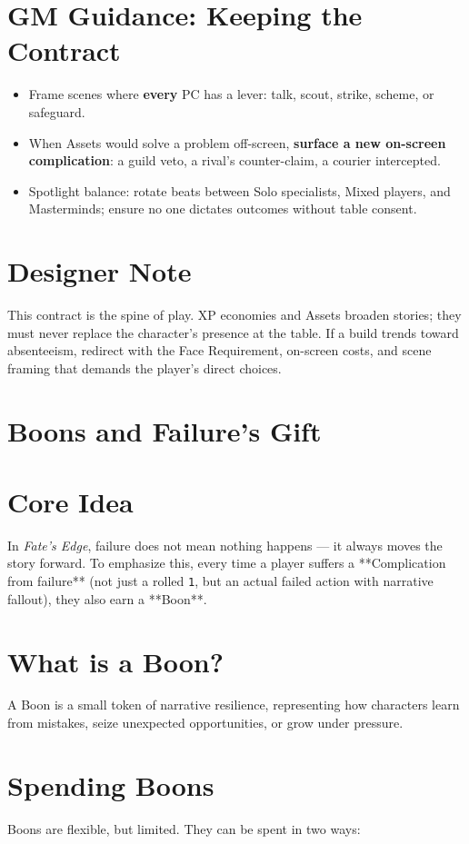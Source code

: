 \documentclass[12pt]{article}
\begin{document}
\section{GM Guidance: Keeping the Contract}
\begin{itemize}
  \item Frame scenes where \textbf{every} PC has a lever: talk, scout, strike, scheme, or safeguard.
  \item When Assets would solve a problem off-screen, \textbf{surface a new on-screen complication}: a guild veto, a rival’s counter-claim, a courier intercepted.
  \item Spotlight balance: rotate beats between Solo specialists, Mixed players, and Masterminds; ensure no one dictates outcomes without table consent.
\end{itemize}

\section{Designer Note}
This contract is the spine of play. XP economies and Assets broaden stories; they must never replace the character’s presence at the table. If a build trends toward absenteeism, redirect with the Face Requirement, on-screen costs, and scene framing that demands the player’s direct choices.

\section{Boons and Failure's Gift}

\section*{Core Idea}
In \textit{Fate’s Edge}, failure does not mean nothing happens — it always moves the story forward.  
To emphasize this, every time a player suffers a **Complication from failure** (not just a rolled \texttt{1}, but an actual failed action with narrative fallout), they also earn a **Boon**.

\section*{What is a Boon?}
A Boon is a small token of narrative resilience, representing how characters learn from mistakes, seize unexpected opportunities, or grow under pressure.

\section*{Spending Boons}
Boons are flexible, but limited. They can be spent in two ways:
\end{document}
